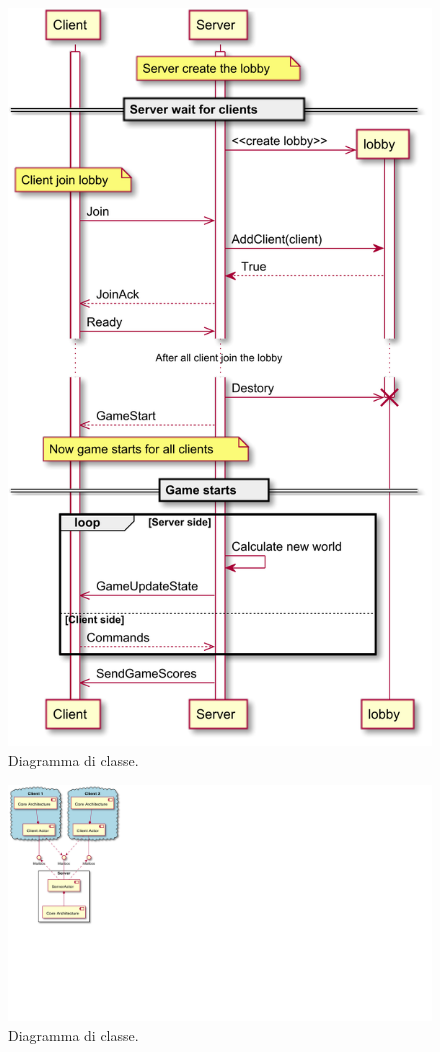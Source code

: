 \begin{figure}[H]
	\centering
	\includegraphics[width=0.99\columnwidth]{plantuml/rendered/sequenceDiagrams/sequenceClientServer.pdf}
	\caption{Diagramma di classe.}
	\label{fig:sequenceClientServer}
\end{figure}


\begin{figure}[H]
	\centering
	\includegraphics[width=0.99\columnwidth]{plantuml/rendered/componentDiagrams/clientServerComponentDiagram.pdf}
	\caption{Diagramma di classe.}
	\label{fig:clientServerComponentDiagram}
\end{figure}